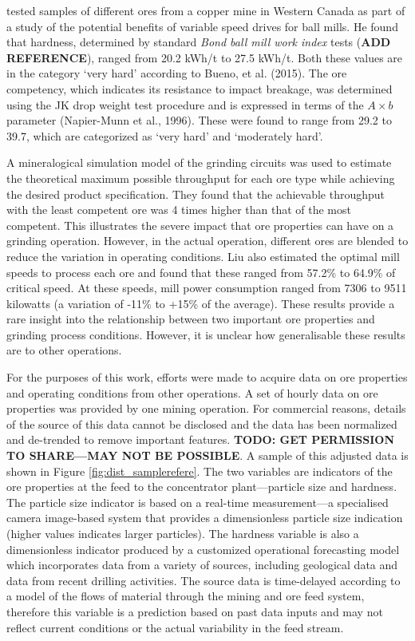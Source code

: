 \cite{liu_development_2018} tested samples of different ores from a copper mine in Western Canada as part of a study of the potential benefits of variable speed drives for ball mills. He found that hardness, determined by standard \textit{Bond ball mill work index} tests  (\textbf{ADD REFERENCE}), ranged from 20.2 kWh/t to 27.5 kWh/t. Both these values are in the category `very hard' according to Bueno, et al. (2015). The ore competency, which indicates its resistance to impact breakage, was determined using the JK drop weight test procedure and is expressed in terms of the $A\times{b}$ parameter (Napier-Munn et al., 1996). These were found to range from 29.2 to 39.7, which are categorized as `very hard' and `moderately hard'.

A mineralogical simulation model of the grinding circuits was used to estimate the theoretical maximum possible throughput for each ore type while achieving the desired product specification. They found that the achievable throughput with the least competent ore was 4 times higher than that of the most competent. This illustrates the severe impact that ore properties can have on a grinding operation. However, in the actual operation, different ores are blended to reduce the variation in operating conditions. Liu also estimated the optimal mill speeds to process each ore and found that these ranged from 57.2\% to 64.9\% of critical speed. At these speeds, mill power consumption ranged from 7306 to 9511 kilowatts (a variation of -11\% to +15\% of the average). These results provide a rare insight into the relationship between two important ore properties and grinding process conditions. However, it is unclear how generalisable these results are to other operations.

For the purposes of this work, efforts were made to acquire data on ore properties and operating conditions from other operations. A set of hourly data on ore properties was provided by one mining operation. For commercial reasons, details of the source of this data cannot be disclosed and the data has been normalized and de-trended to remove important features. \textbf{TODO: GET PERMISSION TO SHARE—MAY NOT BE POSSIBLE}. A sample of this adjusted data is shown in Figure \ref{fig:dist_samplerefere}. The two variables are indicators of the ore properties at the feed to the concentrator plant---particle size and hardness. The particle size indicator is based on a real-time measurement---a specialised camera image-based system that provides a dimensionless particle size indication (higher values indicates larger particles). The hardness variable is also a dimensionless indicator produced by a customized operational forecasting model which incorporates data from a variety of sources, including geological data and data from recent drilling activities. The source data is time-delayed according to a model of the flows of material through the mining and ore feed system, therefore this variable is a prediction based on past data inputs and may not reflect current conditions or the actual variability in the feed stream.

